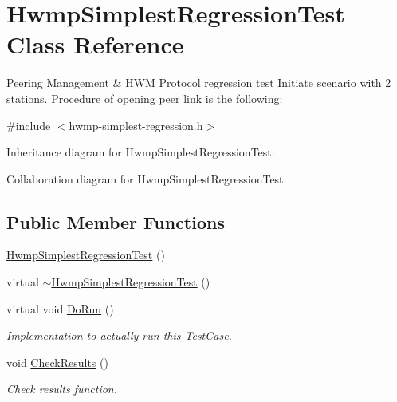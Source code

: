 \hypertarget{classHwmpSimplestRegressionTest}{}\section{Hwmp\+Simplest\+Regression\+Test Class Reference}
\label{classHwmpSimplestRegressionTest}


Peering Management \& H\+WM Protocol regression test Initiate scenario with 2 stations. Procedure of opening peer link is the following\+:  




{\ttfamily \#include $<$hwmp-\/simplest-\/regression.\+h$>$}



Inheritance diagram for Hwmp\+Simplest\+Regression\+Test\+:


Collaboration diagram for Hwmp\+Simplest\+Regression\+Test\+:
\subsection*{Public Member Functions}
\begin{DoxyCompactItemize}
\item 
\hyperlink{classHwmpSimplestRegressionTest_acfa56e71398e76092cc8690d85287698}{Hwmp\+Simplest\+Regression\+Test} ()
\item 
virtual \hyperlink{classHwmpSimplestRegressionTest_a3678b71a16a21344d4c8c1d47289b0de}{$\sim$\+Hwmp\+Simplest\+Regression\+Test} ()
\item 
virtual void \hyperlink{classHwmpSimplestRegressionTest_a66060eab1ba10620e724e97901e03168}{Do\+Run} ()
\begin{DoxyCompactList}\small\item\em Implementation to actually run this Test\+Case. \end{DoxyCompactList}\item 
void \hyperlink{classHwmpSimplestRegressionTest_a5a56889feb77e8f59a94228cfd2537fa}{Check\+Results} ()
\begin{DoxyCompactList}\small\item\em Check results function. \end{DoxyCompactList}\end{DoxyCompactItemize}
